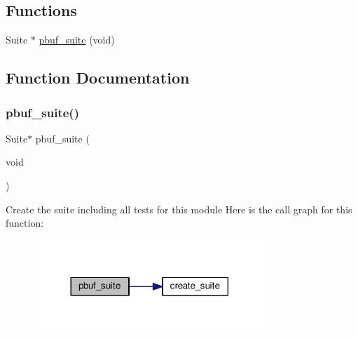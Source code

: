 \subsection*{Functions}
\begin{DoxyCompactItemize}
\item 
Suite $\ast$ \hyperlink{openmote-cc2538_2lwip_2test_2unit_2core_2test__pbuf_8h_ac81dc568cf0cb2d73479ea33562f44c5}{pbuf\+\_\+suite} (void)
\end{DoxyCompactItemize}


\subsection{Function Documentation}
\mbox{\label{openmote-cc2538_2lwip_2test_2unit_2core_2test__pbuf_8h_ac81dc568cf0cb2d73479ea33562f44c5}} 
\subsubsection{\texorpdfstring{pbuf\+\_\+suite()}{pbuf\_suite()}}
{\footnotesize\ttfamily Suite$\ast$ pbuf\+\_\+suite (\begin{DoxyParamCaption}\item[{void}]{ }\end{DoxyParamCaption})}

Create the suite including all tests for this module Here is the call graph for this function\+:
\nopagebreak
\begin{figure}[H]
\begin{center}
\leavevmode
\includegraphics[width=248pt]{openmote-cc2538_2lwip_2test_2unit_2core_2test__pbuf_8h_ac81dc568cf0cb2d73479ea33562f44c5_cgraph}
\end{center}
\end{figure}
